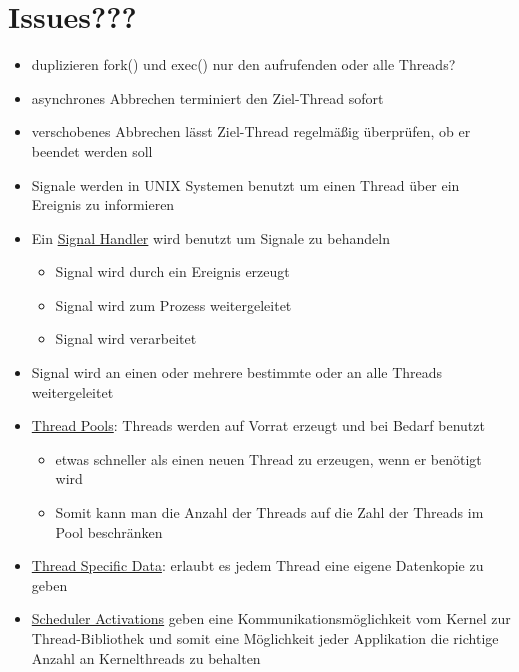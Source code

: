 \documentclass[a4paper]{scrreprt}
\begin{document}
\section{Issues???}
\begin{itemize}
\item duplizieren fork() und exec() nur den aufrufenden oder alle Threads?
\item asynchrones Abbrechen terminiert den Ziel-Thread sofort
\item verschobenes Abbrechen lässt Ziel-Thread regelmäßig überprüfen, ob er beendet werden soll
\item Signale werden in UNIX Systemen benutzt um einen Thread über ein Ereignis zu informieren
\item Ein \underline{Signal Handler} wird benutzt um Signale zu behandeln
\begin{itemize}
\item Signal wird durch ein Ereignis erzeugt
\item Signal wird zum Prozess weitergeleitet
\item Signal wird verarbeitet
\end{itemize}
\item Signal wird an einen oder mehrere bestimmte oder an alle Threads weitergeleitet
\item \underline{Thread Pools}: Threads werden auf Vorrat erzeugt und bei Bedarf benutzt
\begin{itemize}
\item etwas schneller als einen neuen Thread zu erzeugen, wenn er benötigt wird
\item Somit kann man die Anzahl der Threads auf die Zahl der Threads im Pool beschränken
\end{itemize}
\item \underline{Thread Specific Data}: erlaubt es jedem Thread eine eigene Datenkopie zu geben
\item \underline{Scheduler Activations} geben eine Kommunikationsmöglichkeit vom Kernel zur Thread-Bibliothek und somit eine Möglichkeit jeder Applikation die richtige Anzahl an Kernelthreads zu behalten
\end{itemize}
\end{document}
